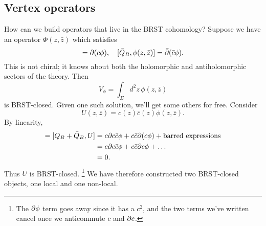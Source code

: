 \subsection*{Vertex operators}
How can we build operators that live in the BRST cohomology? Suppose we have an operator $\Phi(z,\bar z)$ which satisfies
\begin{equation}
    [Q_B,\phi(z,\bar z)]=\p(c\phi),\quad [\bar Q_B, \phi(z,\bar z)]=\bar \p(\bar c \phi).
\end{equation}
This is not chiral; it knows about both the holomorphic and antiholomorphic sectors of the theory. Then
\begin{equation}
    V_\phi = \int_\Sigma d^2z \, \phi(z,\bar z)
\end{equation}
is BRST-closed. Given one such solution, we'll get some others for free. Consider
\begin{equation}
    U(z,\bar z) =c(z) \bar c(z) \phi(z,\bar z).
\end{equation}
By linearity,
\begin{align*}
    [\cQ_B, U]=[Q_B +\bar Q_B, U] &= c\p c \bar c \phi + c\bar c \p(c \phi)+\text{barred expressions}\\
        &= c\p c \bar c \phi + c \bar c \p c\phi +\ldots\\
        &= 0.
\end{align*}
Thus $U$ is BRST-closed.%
    \footnote{The $\partial\phi$ term goes away since it has a $c^2$, and the two terms we've written cancel once we anticommute $\bar c$ and $\partial c$.}
We have therefore constructed two BRST-closed objects, one local and one non-local.
